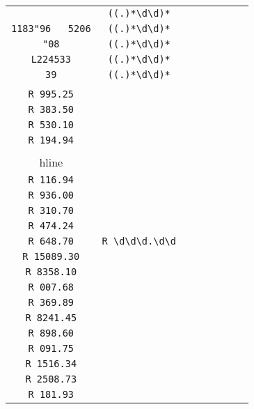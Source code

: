 \begin{longtable}{cccccccc}
\begin{tabular}{ll}
    \verb|b40| & \verb|((.)*\d\d)*|\\
\verb|1183"96	5206| & \verb|((.)*\d\d)*|\\
\verb|"08| & \verb|((.)*\d\d)*|\\
\verb|L224533| & \verb|((.)*\d\d)*|\\
\verb|39| & \verb|((.)*\d\d)*|
\end{tabular}
\\\midrule 
\begin{tabular}{l}
    \verb|R 340.18|\\
\verb|R 995.25|\\
\verb|R 383.50|\\
\verb|R 530.10|\\
\verb|R 194.94|\\
\\hline\\
\verb|R 116.94|\\
\verb|R 936.00|\\
\verb|R 310.70|\\
\verb|R 474.24|\\
\verb|R 648.70|
\end{tabular}

&
\verb|R \d\d\d.\d\d|
&

\begin{tabular}{l}
    \verb|R \d\d\d(\d)*\.\d\d|\\
\verb|R 15089.30|\\
\verb|R 8358.10|\\
\verb|R 007.68|\\
\verb|R 369.89|\\
\verb|R 8241.45|
\end{tabular}

&

\begin{tabular}{l}
    \verb|R \d\d\d(\d)*\.\d\d|\\
\verb|R 898.60|\\
\verb|R 091.75|\\
\verb|R 1516.34|\\
\verb|R 2508.73|\\
\verb|R 181.93|
\end{tabular}

&


\end{longtable}

